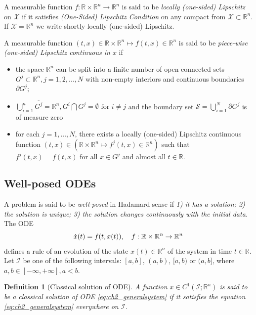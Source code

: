 \documentclass{article}
\newcommand{\R}{\mathbb{R}}
\newtheorem{definition}{Definition}
\begin{document}
{A measurable  function   $f: \R \times \R^{n} \to  \R^n$ is said to be \textit{locally (one-sided) Lipschitz} on $\mathcal{X}$ if it satisfies \textit{(One-Sided) Lipschitz Condition} on any compact from  $\mathcal{X}\subset \R^n$.  If $\mathcal{X}=\R^n$ we write shortly locally  (one-sided) Lipschitz.} 

A measurable  function   $(t,x)\in \R \times \R^{n} \mapsto f(t,x)\in \R^n$ is said to be \textit{piece-wise {(one-sided) Lipschitz} continuous in $x$}  if 
\begin{itemize}
	\item the space  $\R^{n}$ can be split into a finite number
	of open connected sets $G^j\subset \R^{n}, j=1,2,...,N$ with non-empty interiors  and continuous boundaries  $\partial G^j$;
	\item 
	$\bigcup_{i=1}^n \overline{G^j}=\R^n, G^i\bigcap G^j=\emptyset 
	\text{ for } i\neq j
	$ and the boundary set 
	$\mathcal{S}=\bigcup_{i=1}^N \partial G^j$ is
	of measure zero 
	\item  for each $j=1,...,N$,
	there exists  a locally (one-sided) Lipschitz continuous function $(t,x)\in (\R \times \R^{n} \mapsto f^j(t,x)\in \R^n)$ such that
  $f^j(t,x)\!=\!f(t,x)$ for  all $x\!\in\! G^j$ and almost all $t\!\in\! \R$.
\end{itemize}
\vspace{-1mm}
\subsection{Well-posed ODEs}
A problem is said to be \textit{well-posed} in Hadamard sense if 
\textit{1) it has a solution; 2) the solution is unique; 3) the solution  changes continuously with the initial data.}  
The  ODE\vspace{-1mm}
\begin{equation}\label{eq:ch2_generalsystem}
	\dot x(t) = f(t,x(t)), \quad f :\R \times \R^n\to  \R^n\vspace{-1mm}
\end{equation} 
defines a rule of an evolution of the state $x(t)\in \R^n$ of the system in time $t\in \R$.
Let $\mathcal{I}$ be one of the following intervals: $[a,b]$, $(a,b)$, $[a,b)$ or $(a,b]$, where $a,b\in[-\infty,+\infty],a<b$.
\begin{definition}[\small Classical solution of ODE]\; 
	\itshape 	A  function $ x\in C^1(\mathcal{I};  \R^n)$ is said to be a {classical solution of ODE} \eqref{eq:ch2_generalsystem} if
	it satisfies the equation \eqref{eq:ch2_generalsystem} everywhere on  $\mathcal{I}$.
\end{definition}
\end{document}
